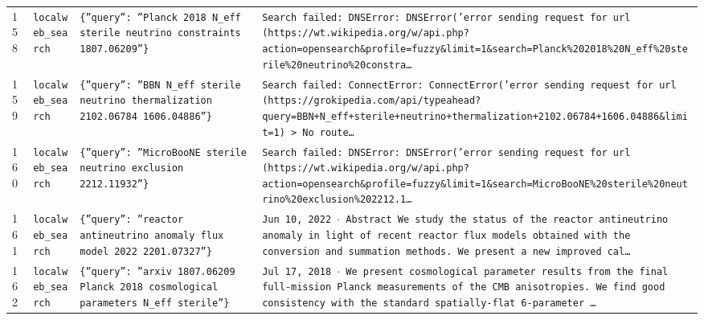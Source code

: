\documentclass[11pt,a4paper]{article}
\begin{document}
\begin{longtable}{@{}p{}p{}p{}p{}@{}}
158 & \texttt{local}\newline\texttt{web\_\allowbreak{}search} & \texttt{\{''query'':\allowbreak{} ''Planck 2018 N\_\allowbreak{}eff sterile neutrino constraints 1807.06209''\}\allowbreak{}} & \texttt{Search failed:\allowbreak{} DNSError:\allowbreak{} DNSError('error sending request for url (https:\allowbreak{}/\allowbreak{}/\allowbreak{}wt.wikipedia.org/\allowbreak{}w/\allowbreak{}api.php?action=\allowbreak{}opensearch\&profile=\allowbreak{}fuzzy\&limit=\allowbreak{}1\&search=\allowbreak{}Planck\%202018\%20N\_\allowbreak{}eff\%20sterile\%20neutrino\%20constra\ldots{}\allowbreak{}} \\
159 & \texttt{local}\newline\texttt{web\_\allowbreak{}search} & \texttt{\{''query'':\allowbreak{} ''BBN N\_\allowbreak{}eff sterile neutrino thermalization 2102.06784 1606.04886''\}\allowbreak{}} & \texttt{Search failed:\allowbreak{} ConnectError:\allowbreak{} ConnectError('error sending request for url (https:\allowbreak{}/\allowbreak{}/\allowbreak{}grokipedia.com/\allowbreak{}api/\allowbreak{}typeahead?query=\allowbreak{}BBN+N\_\allowbreak{}eff+sterile+neutrino+thermalization+2102.06784+1606.04886\&limit=\allowbreak{}1)\allowbreak{} \textgreater{}\allowbreak{} No route\ldots{}\allowbreak{}} \\
160 & \texttt{local}\newline\texttt{web\_\allowbreak{}search} & \texttt{\{''query'':\allowbreak{} ''MicroBooNE sterile neutrino exclusion 2212.11932''\}\allowbreak{}} & \texttt{Search failed:\allowbreak{} DNSError:\allowbreak{} DNSError('error sending request for url (https:\allowbreak{}/\allowbreak{}/\allowbreak{}wt.wikipedia.org/\allowbreak{}w/\allowbreak{}api.php?action=\allowbreak{}opensearch\&profile=\allowbreak{}fuzzy\&limit=\allowbreak{}1\&search=\allowbreak{}MicroBooNE\%20sterile\%20neutrino\%20exclusion\%202212.1\ldots{}\allowbreak{}} \\
161 & \texttt{local}\newline\texttt{web\_\allowbreak{}search} & \texttt{\{''query'':\allowbreak{} ''reactor antineutrino anomaly flux model 2022 2201.07327''\}\allowbreak{}} & \texttt{Jun 10,\allowbreak{} 2022 $\cdot$ Abstract We study the status of the reactor antineutrino anomaly in light of recent reactor flux models obtained with the conversion and summation methods. We present a new improved cal\ldots{}\allowbreak{}} \\
162 & \texttt{local}\newline\texttt{web\_\allowbreak{}search} & \texttt{\{''query'':\allowbreak{} ''arxiv 1807.06209 Planck 2018 cosmological parameters N\_\allowbreak{}eff sterile''\}\allowbreak{}} & \texttt{Jul 17,\allowbreak{} 2018 $\cdot$ We present cosmological parameter results from the final full-mission Planck measurements of the CMB anisotropies. We find good consistency with the standard spatially-flat 6-parameter \ldots{}\allowbreak{}} \\

\end{longtable}
\end{document}
